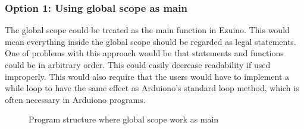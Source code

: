 \subsubsection{Option 1: Using global scope as main}
The global scope could be treated as the main function in Ezuino. This would mean everything inside the global scope should be regarded as legal statements. One of problems with this approach would be that statements and functions could be in arbitrary order. This could easily decrease readability if used improperly.
This would also require that the users would have to implement a while loop to have the same effect as Arduiono's standard loop method, which is often necessary in Arduiono programs. 
\begin{figure}[H]
\centering
{}
\caption{Program structure where global scope work as main}
\label{lf10}
\end{figure}

